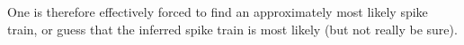 One is therefore effectively forced to find an approximately most likely spike train, or guess that the inferred spike train is most likely (but not really be sure).  %
%

